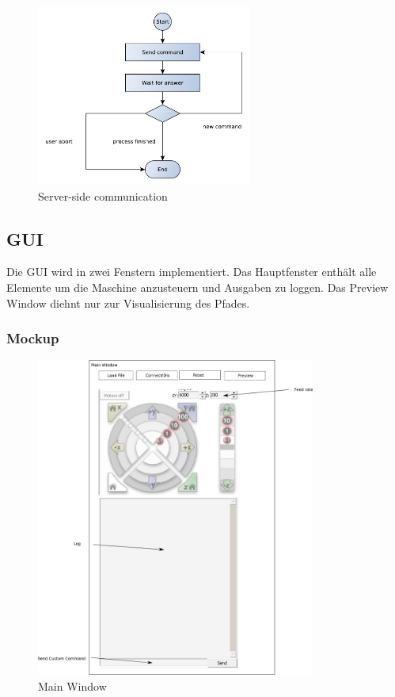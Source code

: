 \documentclass[11pt,a4paper,bibtotoc,oneside]{scrbook}
\begin{document}
        \begin{figure}[H]
    \centering
        \includegraphics[width=200pt]{./picture/process2.pdf}
        \caption{\label{main}{Server-side communication}}
    \end{figure}

\subsection{GUI}
Die GUI wird in zwei Fenstern implementiert. Das Hauptfenster enthält alle Elemente um die Maschine anzusteuern und Ausgaben zu loggen.
Das Preview Window diehnt nur zur Visualisierung des Pfades.
\subsubsection{Mockup}
    \begin{figure}[H]
    \centering
        \includegraphics[width=260pt]{./picture/gui_main.png}
        \caption{\label{main}{Main Window}}
    \end{figure}
    
\end{document}
